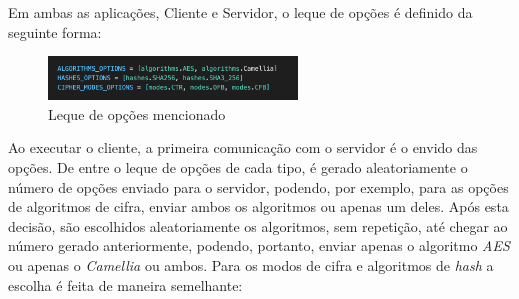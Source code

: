 \documentclass[10pt,english]{article}
\begin{document}
 \clearpage
 
 \par Em ambas as aplicações, Cliente e Servidor, o leque de opções é definido da seguinte forma:
 
  \begin{figure}[!h]
        \centering
        \includegraphics[width=250]{images/cipher_suite.png}
        \caption{Leque de opções mencionado}
    \end{figure}
 
 \par Ao executar o cliente, a primeira comunicação com o servidor é o envido das opções. De entre o leque de opções de cada tipo, é gerado aleatoriamente o número de opções enviado para o servidor, podendo, por exemplo, para as opções de algoritmos de cifra, enviar ambos os algoritmos ou apenas um deles. Após esta decisão, são escolhidos aleatoriamente os algoritmos, sem repetição, até chegar ao número gerado anteriormente, podendo, portanto, enviar apenas o algoritmo \textit{AES} ou apenas o \textit{Camellia} ou ambos. Para os modos de cifra e algoritmos de \textit{hash} a escolha é feita de maneira semelhante: 
\end{document}
